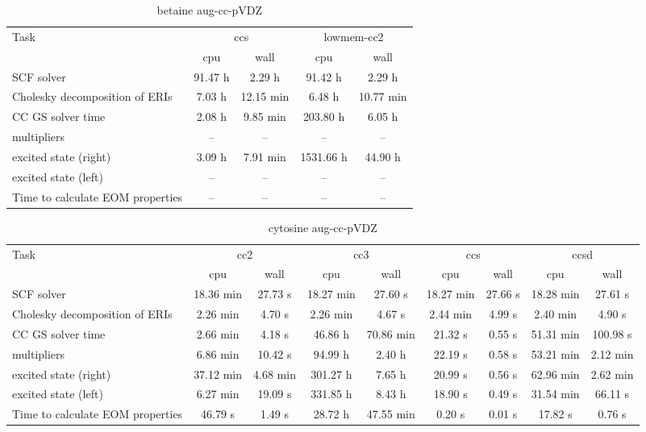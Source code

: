 \documentclass{article}
\begin{document}
\begin{table}
\caption{betaine aug-cc-pVDZ}
\begin{tabular}{lcccc}
\toprule
Task & \multicolumn{2}{c}{ccs} & \multicolumn{2}{c}{lowmem-cc2}\\
\cmidrule(lr){2-3}\cmidrule(lr){4-5}
 & cpu & wall & cpu & wall\\
\midrule
SCF solver & 91.47 h & 2.29 h & 91.42 h & 2.29 h\\
Cholesky decomposition of ERIs & 7.03 h & 12.15 min & 6.48 h & 10.77 min\\
CC GS solver time & 2.08 h & 9.85 min & 203.80 h & 6.05 h\\
multipliers & -- & -- & -- & --\\
excited state (right) & 3.09 h & 7.91 min & 1531.66 h & 44.90 h\\
excited state (left) & -- & -- & -- & --\\
Time to calculate EOM properties & -- & -- & -- & --\\
\bottomrule
\end{tabular}
\end{table}
\begin{table}
\caption{cytosine aug-cc-pVDZ}
\begin{tabular}{lcccccccc}
\toprule
Task & \multicolumn{2}{c}{cc2} & \multicolumn{2}{c}{cc3} & \multicolumn{2}{c}{ccs} & \multicolumn{2}{c}{ccsd}\\
\cmidrule(lr){2-3}\cmidrule(lr){4-5}\cmidrule(lr){6-7}\cmidrule(lr){8-9}
 & cpu & wall & cpu & wall & cpu & wall & cpu & wall\\
\midrule
SCF solver & 18.36 min & 27.73 s & 18.27 min & 27.60 s & 18.27 min & 27.66 s & 18.28 min & 27.61 s\\
Cholesky decomposition of ERIs & 2.26 min & 4.70 s & 2.26 min & 4.67 s & 2.44 min & 4.99 s & 2.40 min & 4.90 s\\
CC GS solver time & 2.66 min & 4.18 s & 46.86 h & 70.86 min & 21.32 s & 0.55 s & 51.31 min & 100.98 s\\
multipliers & 6.86 min & 10.42 s & 94.99 h & 2.40 h & 22.19 s & 0.58 s & 53.21 min & 2.12 min\\
excited state (right) & 37.12 min & 4.68 min & 301.27 h & 7.65 h & 20.99 s & 0.56 s & 62.96 min & 2.62 min\\
excited state (left) & 6.27 min & 19.09 s & 331.85 h & 8.43 h & 18.90 s & 0.49 s & 31.54 min & 66.11 s\\
Time to calculate EOM properties & 46.79 s & 1.49 s & 28.72 h & 47.55 min & 0.20 s & 0.01 s & 17.82 s & 0.76 s\\
\bottomrule
\end{tabular}
\end{table}
\end{document}
